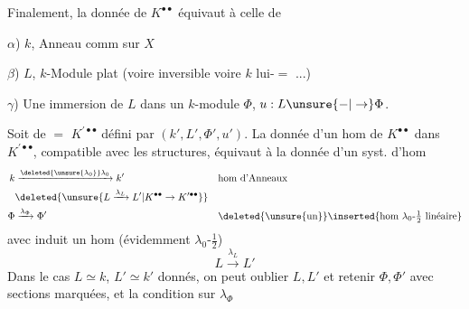 
Finalement, la donnée de $K^{\bullet\bullet}$ équivaut à celle de

$\alpha$) $k$, Anneau comm sur $X$

$\beta$) $L$, $k$-Module plat (voire inversible voire $k$ lui-$=$ ...)

$\gamma$) Une immersion de $L$ dans un $k$-module $\Phi$, $u:L\unsure{\mathord{-}|\to}\Phi$.

Soit de $=$ $K^{\prime\bullet\bullet}$ défini par $(k',L',\Phi',u')$.  La donnée d'un hom \inserted{$\lambda$} de $K^{\bullet\bullet}$ dans $K^{\prime\bullet\bullet}$, compatible avec  les structures, équivaut à la donnée d'un syst. d'hom
\[
\begin{aligned}
k&\xrightarrow{\deleted{\unsure{\lambda_0}}\lambda_0}k' &&\text{hom d'Anneaux}\\
&\deleted{\unsure{L\xrightarrow{\lambda_L}L'|K^{\bullet\bullet}\to K^{\prime\bullet\bullet}}}\\
\Phi&\xrightarrow{\lambda_\Phi}\Phi' &&\deleted{\unsure{\text{un}}}\inserted{\text{hom }\lambda_0\text{-}\tfrac12\text{ linéaire}}
\end{aligned}
\]
avec  induit un hom (évidemment $\lambda_0$-$\frac12$)
\[
L\xrightarrow{\lambda_L}L'
\]
Dans le cas $L\simeq k$, $L'\simeq k'$ donnés, on peut oublier $L,L'$ et retenir $\Phi,\Phi'$ avec sections marquées, et la condition sur $\lambda_\Phi$
